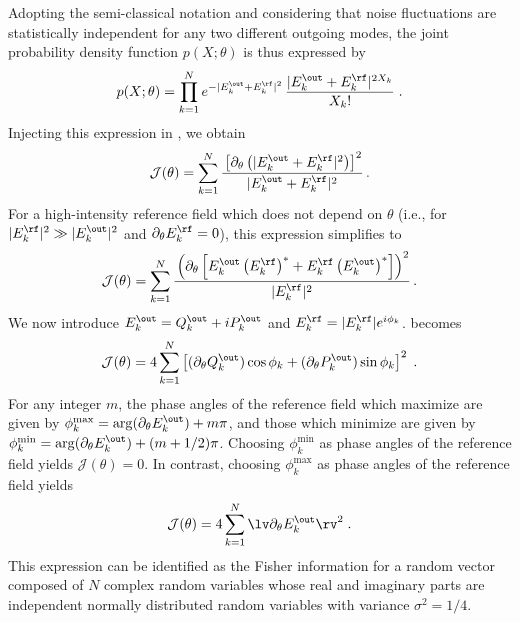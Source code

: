 \documentclass[aps,pra,twocolumn,amsmath,amssymb,superscriptaddress,10pt,nobibnotes]{revtex4-2}
\begin{document}
Adopting the semi-classical notation and considering that noise fluctuations are statistically independent for any two different outgoing modes, the joint probability density function $p(X;\theta)$ is thus expressed by
\begin{equation}
p(X;\theta) = \prod_{k=1}^N e^{-|E_k^\out+E_k^\rf|^2} \, \frac{|E_k^\out+E_k^\rf|^{2 X_k}}{X_k!} \; .
\label{pdf_classical}
\end{equation}
Injecting this expression in , we obtain
\begin{equation}
\mathcal{J}(\theta)= \sum_{k=1}^N \cfrac{\left[\partial_\theta \left(|E_k^\out+E_k^\rf|^2\right)\right]^2}{|E_k^\out+E_k^\rf|^2} \; .
\end{equation}
For a high-intensity reference field which does not depend on $\theta$ (i.e., for $|E_k^\rf|^2 \gg |E_k^\out|^2$ and $\partial_\theta E_k^\rf=0$), this expression simplifies to 
\begin{equation}
\mathcal{J}(\theta)= \sum_{k=1}^N \cfrac{\left( \partial_\theta \left[ E_k^\out \left(E_k^\rf\right)^* + E_k^\rf \left(E_k^\out\right)^* \right] \right)^2}{|E_k^\rf|^2} \; .
\label{eq_fisher_interf}
\end{equation} 
We now introduce $E_k^\out = Q_k^\out + i P_k^\out $ and $E_k^\rf=|E_k^\rf| e^{i \phi_k}$.  becomes
\begin{equation}
\mathcal{J}(\theta)= 4 \sum_{k=1}^N \left[ (\partial_\theta Q_k^\out) \cos \phi_k + (\partial_\theta P_k^\out) \sin \phi_k \right]^2 \; .
\label{eq_fisher_expanded}
\end{equation}
For any integer $m$, the phase angles of the reference field which maximize  are given by $\phi_k^\mathrm{max} = \arg (\partial_\theta E_k^\out)+ m \pi$, and those which minimize  are given by $\phi_k^\mathrm{min} = \arg (\partial_\theta E_k^\out)+ (m+1/2) \pi$. Choosing $\phi_k^\mathrm{min}$ as phase angles of the reference field yields $\mathcal{J}(\theta)= 0$. In contrast, choosing $\phi_k^\mathrm{max}$ as phase angles of the reference field yields
\begin{equation}
\mathcal{J}(\theta)= 4 \sum_{k=1}^N \lv \partial_\theta E^\out_k \rv^2 \; .
\label{fisher_optim_ref}
\end{equation}
This expression can be identified as the Fisher information for a random vector composed of $N$ complex random variables whose real and imaginary parts are independent normally distributed random variables with variance $\sigma^2=1/4$.
\end{document}
